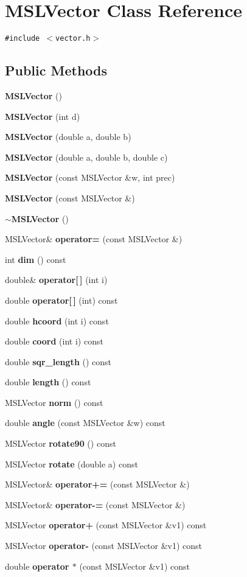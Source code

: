 \section{MSLVector  Class Reference}
\label{class_MSLVector}
{\tt \#include $<$vector.h$>$}

\subsection*{Public Methods}
\begin{CompactItemize}
\item 
{\bf MSLVector} ()
\item 
{\bf MSLVector} (int d)
\item 
{\bf MSLVector} (double a, double b)
\item 
{\bf MSLVector} (double a, double b, double c)
\item 
{\bf MSLVector} (const MSLVector \&w, int prec)
\item 
{\bf MSLVector} (const MSLVector \&)
\item 
{\bf $\sim$MSLVector} ()
\item 
MSLVector\& {\bf operator=} (const MSLVector \&)
\item 
int {\bf dim} () const
\item 
double\& {\bf operator[$\,$]} (int i)
\item 
double {\bf operator[$\,$]} (int) const
\item 
double {\bf hcoord} (int i) const
\item 
double {\bf coord} (int i) const
\item 
double {\bf sqr\_\-length} () const
\item 
double {\bf length} () const
\item 
MSLVector {\bf norm} () const
\item 
double {\bf angle} (const MSLVector \&w) const
\item 
MSLVector {\bf rotate90} () const
\item 
MSLVector {\bf rotate} (double a) const
\item 
MSLVector\& {\bf operator+=} (const MSLVector \&)
\item 
MSLVector\& {\bf operator-=} (const MSLVector \&)
\item 
MSLVector {\bf operator+} (const MSLVector \&v1) const
\item 
MSLVector {\bf operator-} (const MSLVector \&v1) const
\item 
double {\bf operator $\ast$} (const MSLVector \&v1) const

\end{CompactItemize}
